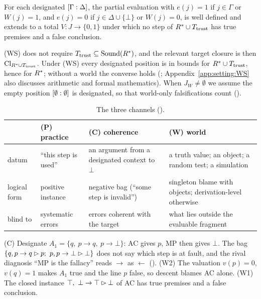 \begin{assumption}\label{asm:setting:WS}
For each designated $[\Gamma : \Delta]$, the partial evaluation with $e(j)=1$
if $j\in\Gamma$ or $W(j)=1$, and $e(j)=0$ if $j\in\Delta\cup\{\bot\}$ or $W(j)=0$,
is well defined and extends to a total $V:J\to\{0,1\}$ under which no step of
$R^{*}\cup T_{\mathrm{trust}}$ has true premises and a false conclusion.
\end{assumption}

(WS) does not require $T_{\mathrm{trust}}\subseteq\mathrm{Sound}(R^{*})$, and the relevant target
closure is then $\mathrm{Cl}_{R^{*}\cup T_{\mathrm{trust}}}$. Under (WS) every designated position is
in bounds for $R^{*}\cup T_{\mathrm{trust}}$, hence for $R^{*}$; without a world the
converse holds (; Appendix~\ref{app:setting:WS} also
discusses arithmetic and formal mathematics). When $J_W\neq\emptyset$ we assume
the empty position $[\emptyset : \emptyset]$ is designated, so that world-only
falsifications count ().

\begin{table}[t]
\centering\small
\begin{tabularx}{\textwidth}{@{}lXXX@{}}
\toprule
 & (P) practice & (C) coherence & (W) world \\
\midrule
datum & ``this step is used'' & an argument from a designated context to $\bot$ & a truth value; an object; a random test; a simulation \\
logical form & positive instance & negative bag (``some step is invalid'') & singleton blame with objects; derivation-level otherwise \\
blind to & systematic errors & errors coherent with the target & what lies outside the evaluable fragment \\
\bottomrule
\end{tabularx}
\caption{The three channels ().}
\label{tab:setting:channels}
\end{table}

\begin{example}\label{ex:setting:nd2}
(C) Designate $A_1=\{q,\ p\to q,\ p\to\bot\}$: AC gives $p$, MP then gives $\bot$.
The bag $\{q,p\to q\step p;\ p,p\to\bot\step\bot\}$ does not say which step is at
fault, and the rival diagnosis ``MP is the fallacy'' reads $\to$ as $\leftarrow$
(). (W2) The valuation $v(p)=0$, $v(q)=1$ makes $A_1$ true and
the line $p$ false, so descent blames AC alone. (W1) The closed instance
$\top,\ \bot\to\top\rhd\bot$ of AC has true premises and a false conclusion.
\end{example}

